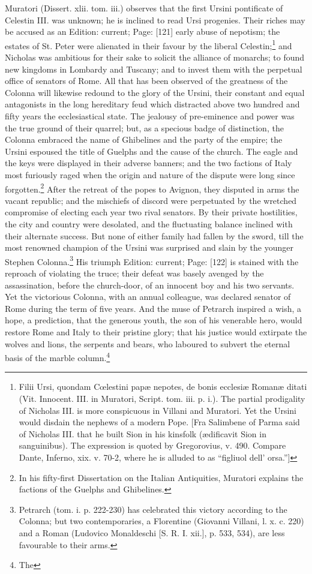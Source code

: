 {Muratori (Dissert. xlii. tom. iii.) observes that the first Ursini pontificate of Celestin III. was unknown; he is inclined to read Ursi progenies.} Their riches may be accused as an Edition: current; Page: [121] early abuse of nepotism; the estates of St. Peter were alienated in their favour by the liberal Celestin;\footnote{Filii Ursi, quondam Cœlestini papæ nepotes, de bonis ecclesiæ Romanæ ditati (Vit. Innocent. III. in Muratori, Script. tom. iii. p. i.). The partial prodigality of Nicholas III. is more conspicuous in Villani and Muratori. Yet the Ursini would disdain the nephews of a modern Pope. [Fra Salimbene of Parma said of Nicholas III. that he built Sion in his kinsfolk (ædificavit Sion in sanguinibus). The expression is quoted by Gregorovius, v. 490. Compare Dante, Inferno, xix. v. 70-2, where he is alluded to as \texthebrew{“}figliuol dell\texthebrew{}’ orsa.\texthebrew{}”]} and Nicholas was ambitious for their sake to solicit the alliance of monarchs; to found new kingdoms in Lombardy and Tuscany; and to invest them with the perpetual office of senators of Rome. All that has been observed of the greatness of the Colonna will likewise redound to the glory of the Ursini, their constant and equal antagonists in the long hereditary feud which distracted above two hundred and fifty years the ecclesiastical state. The jealousy of pre-eminence and power was the true ground of their quarrel; but, as a specious badge of distinction, the Colonna embraced the name of Ghibelines and the party of the empire; the Ursini espoused the title of Guelphs and the cause of the church. The eagle and the keys were displayed in their adverse banners; and the two factions of Italy most furiously raged when the origin and nature of the dispute were long since forgotten.\footnote{In his fifty-first Dissertation on the Italian Antiquities, Muratori explains the factions of the Guelphs and Ghibelines.} After the retreat of the popes to Avignon, they disputed in arms the vacant republic; and the mischiefs of discord were perpetuated by the wretched compromise of electing each year two rival senators. By their private hostilities, the city and country were desolated, and the fluctuating balance inclined with their alternate success. But none of either family had fallen by the sword, till the most renowned champion of the Ursini was surprised and slain by the younger Stephen Colonna.\footnote{Petrarch (tom. i. p. 222-230) has celebrated this victory according to the Colonna; but two contemporaries, a Florentine (Giovanni Villani, l. x. c. 220) and a Roman (Ludovico Monaldeschi [S. R. I. xii.], p. 533, 534), are less favourable to their arms.} His triumph Edition: current; Page: [122] is stained with the reproach of violating the truce; their defeat was basely avenged by the assassination, before the church-door, of an innocent boy and his two servants. Yet the victorious Colonna, with an annual colleague, was declared senator of Rome during the term of five years. And the muse of Petrarch inspired a wish, a hope, a prediction, that the generous youth, the son of his venerable hero, would restore Rome and Italy to their pristine glory; that his justice would extirpate the wolves and lions, the serpents and bears, who laboured to subvert the eternal basis of the marble column.\footnote{The }
